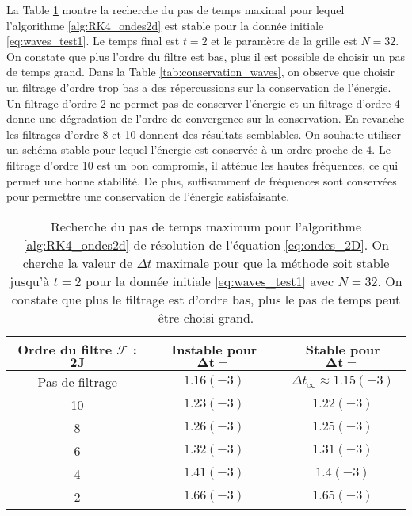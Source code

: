 La Table \ref{tab:dt_critique_waves} montre la recherche du pas de temps maximal pour lequel l'algorithme \ref{alg:RK4_ondes2d} est stable pour la donnée initiale \eqref{eq:waves_test1}. Le temps final est $t=2$ et le paramètre de la grille est $N=32$. On constate que plus l'ordre du filtre est bas, plus il est possible de choisir un pas de temps grand. Dans la Table \ref{tab:conservation_waves}, on observe que choisir un filtrage d'ordre trop bas a des répercussions sur la conservation de l'énergie. Un filtrage d'ordre 2 ne permet pas de conserver l'énergie et un filtrage d'ordre 4 donne une dégradation de l'ordre de convergence sur la conservation. En revanche les filtrages d'ordre 8 et 10 donnent des résultats semblables. On souhaite utiliser un schéma stable pour lequel l'énergie est conservée à un ordre proche de 4. Le filtrage d'ordre 10 est un bon compromis, il atténue les hautes fréquences, ce qui permet une bonne stabilité. De plus, suffisamment de fréquences sont conservées pour permettre une conservation de l'énergie satisfaisante.

\begin{table}[htbp]
\begin{center}
\begin{tabular}{|c||c|c|}
\hline
\textbf{Ordre du filtre } $\mathbf{\mathcal{F}}$ : $\mathbf{2J}$  & \textbf{Instable pour} $\mathbf{\Delta t =}$ & \textbf{Stable pour} $\mathbf{\Delta t =}$ \\
\hline
\hline
Pas de filtrage & $1.16(-3)$ & $\Delta t _{\infty} \approx 1.15(-3)$\\
10 & $1.23(-3)$ & $1.22(-3)$ \\
8 & $1.26(-3)$ & $1.25(-3)$ \\
6 & $1.32(-3)$ & $1.31(-3)$ \\
4 & $1.41(-3)$ & $1.4(-3)$ \\
2 & $1.66(-3)$ & $1.65(-3)$ \\
\hline
\end{tabular}
\end{center}
\caption{Recherche du pas de temps maximum pour l'algorithme \ref{alg:RK4_ondes2d} de résolution de l'équation \eqref{eq:ondes_2D}. On cherche la valeur de $\Delta t$ maximale pour que la méthode soit stable jusqu'à $t=2$ pour la donnée initiale \eqref{eq:waves_test1} avec $N=32$. On constate que plus le filtrage est d'ordre bas, plus le pas de temps peut être choisi grand.}
\label{tab:dt_critique_waves}
\end{table} 


